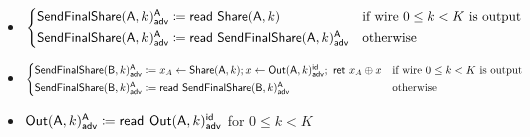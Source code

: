 \begin{itemize}
\item {\color{blue} $\begin{cases*} \LeakSendFinalShare(\A,k)^\A_\adv \coloneqq \read{\Share(\A,k)} & \text{if wire $0 \leq k < K$ is output} \\ \LeakSendFinalShare(\A,k)^\A_\adv \coloneqq \read{\LeakSendFinalShare(\A,k)^\A_\adv} & \text{otherwise} \end{cases*}$}
\item {\color{blue} $\begin{cases*} \LeakSendFinalShare(\B,k)^\A_\adv \coloneqq x_A \leftarrow \Share(\A,k); x \leftarrow \LeakOut(\A,k)^\id_\adv; \ \ret{x_A \oplus x} & \text{if wire $0 \leq k < K$ is output} \\ \LeakSendFinalShare(\B,k)^\A_\adv \coloneqq \read{\LeakSendFinalShare(\B,k)^\A_\adv} & \text{otherwise} \end{cases*}$}
\item {\color{blue} $\mathsf{Out}(\mathsf{A},k)^{\mathsf{A}}_{\mathsf{adv}} \coloneqq \mathsf{read} \ \mathsf{Out}(\mathsf{A},k)^{\mathsf{id}}_{\mathsf{adv}}$ for $0 \leq k < K$}
\end{itemize}